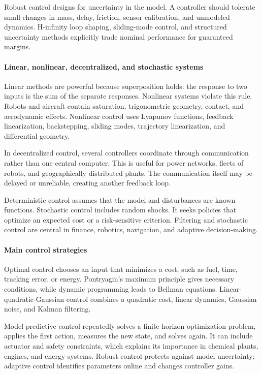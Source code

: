 Robust control designs for uncertainty in the model. A controller should tolerate small changes in mass, delay, friction, sensor calibration, and unmodeled dynamics. H-infinity loop shaping, sliding-mode control, and structured uncertainty methods explicitly trade nominal performance for guaranteed margins. \cite{control_theory_ref2,control_theory_ref9}

\paragraph{Linear, nonlinear, decentralized, and stochastic systems}

Linear methods are powerful because superposition holds: the response to two inputs is the sum of the separate responses. Nonlinear systems violate this rule. Robots and aircraft contain saturation, trigonometric geometry, contact, and aerodynamic effects. Nonlinear control uses Lyapunov functions, feedback linearization, backstepping, sliding modes, trajectory linearization, and differential geometry.

In decentralized control, several controllers coordinate through communication rather than one central computer. This is useful for power networks, fleets of robots, and geographically distributed plants. The communication itself may be delayed or unreliable, creating another feedback loop.

Deterministic control assumes that the model and disturbances are known functions. Stochastic control includes random shocks. It seeks policies that optimize an expected cost or a risk-sensitive criterion. Filtering and stochastic control are central in finance, robotics, navigation, and adaptive decision-making.

\paragraph{Main control strategies}

Optimal control chooses an input that minimizes a cost, such as fuel, time, tracking error, or energy. Pontryagin's maximum principle gives necessary conditions, while dynamic programming leads to Bellman equations. Linear-quadratic-Gaussian control combines a quadratic cost, linear dynamics, Gaussian noise, and Kalman filtering.

Model predictive control repeatedly solves a finite-horizon optimization problem, applies the first action, measures the new state, and solves again. It can include actuator and safety constraints, which explains its importance in chemical plants, engines, and energy systems. Robust control protects against model uncertainty; adaptive control identifies parameters online and changes controller gains.

